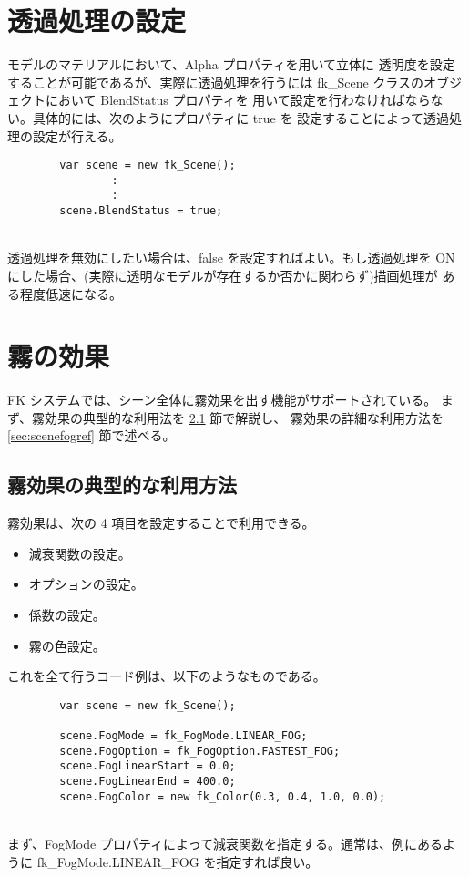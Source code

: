 \section{透過処理の設定} \label{sec:scenetrans}
モデルのマテリアルにおいて、Alpha プロパティを用いて立体に
透明度を設定することが可能であるが、実際に透過処理を行うには
fk\_Scene クラスのオブジェクトにおいて BlendStatus プロパティを
用いて設定を行わなければならない。具体的には、次のようにプロパティに true を
設定することによって透過処理の設定が行える。
\\
\begin{screen}
\begin{verbatim}
        var scene = new fk_Scene();
                :
                :
        scene.BlendStatus = true;
\end{verbatim}
\end{screen}
~ \\
透過処理を無効にしたい場合は、false を設定すればよい。もし透過処理を
ON にした場合、(実際に透明なモデルが存在するか否かに関わらず)描画処理が
ある程度低速になる。

\section{霧の効果}
FK システムでは、シーン全体に霧効果を出す機能がサポートされている。
まず、霧効果の典型的な利用法を \ref{sec:scenefogintro} 節で解説し、
霧効果の詳細な利用方法を \ref{sec:scenefogref} 節で述べる。

\subsection{霧効果の典型的な利用方法} \label{sec:scenefogintro}
霧効果は、次の 4 項目を設定することで利用できる。
\begin{itemize}
 \item 減衰関数の設定。
 \item オプションの設定。
 \item 係数の設定。
 \item 霧の色設定。
\end{itemize}
これを全て行うコード例は、以下のようなものである。
\\
\begin{breakbox}
\begin{verbatim}
        var scene = new fk_Scene();

        scene.FogMode = fk_FogMode.LINEAR_FOG;
        scene.FogOption = fk_FogOption.FASTEST_FOG;
        scene.FogLinearStart = 0.0;
        scene.FogLinearEnd = 400.0;
        scene.FogColor = new fk_Color(0.3, 0.4, 1.0, 0.0);
\end{verbatim}
\end{breakbox}
~ \\
まず、FogMode プロパティによって減衰関数を指定する。通常は、例にあるように
fk\_FogMode.LINEAR\_FOG を指定すれば良い。

